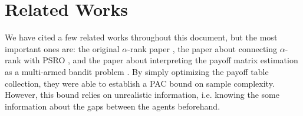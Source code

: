 \documentclass{article}
\begin{document}
\section{Related Works}
We have cited a few related works throughout this document, but the most
important ones are: the original $\alpha$-rank paper \cite{alpha}, the paper about
connecting $\alpha$-rank with PSRO \cite{alphaPSRO}, and the paper about
interpreting the payoff matrix estimation as a multi-armed bandit problem
\cite{goodone}. By simply optimizing the payoff table collection, they were
able to establish a PAC bound on sample complexity. However, this bound relies
on unrealistic information, i.e. knowing the some information about the gaps
between the agents beforehand.




\end{document}
